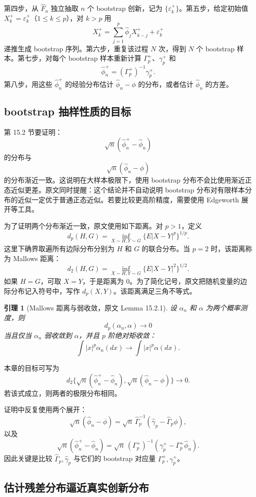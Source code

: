\documentclass[11pt,a4paper,openany]{ctexbook}
\newtheorem{lemma}{引理}[section]
\begin{document}
第四步，从 \(\hat F_n\) 独立抽取 \(n\) 个 bootstrap 创新，记为 \(\{\varepsilon_k^+\}\)。第五步，给定初始值 \(X_k^+=\varepsilon_k^+\)（\(1\le k\le p\)），对 \(k>p\) 用
\[
  X_k^+=\sum_{j=1}^p\hat\phi_jX_{k-j}^+ + \varepsilon_k^+
\]
递推生成 bootstrap 序列。第六步，重复该过程 \(N\) 次，得到 \(N\) 个 bootstrap 样本。第七步，对每个 bootstrap 样本重新计算 \(\Gamma_p^+\)、\(\gamma_p^+\) 和
\[
  \hat\phi_n^+=(\Gamma_p^+)^{-1}\gamma_p^+.
\]
第八步，用这些 \(\hat\phi_n^+\) 的经验分布估计 \(\hat\phi_n-\phi\) 的分布，或者估计 \(\hat\phi_n\) 的方差。

\subsection{bootstrap 抽样性质的目标}

第 15.2 节要证明：
\[
  \sqrt n(\hat\phi_n^+-\hat\phi_n)
\]
的分布与
\[
  \sqrt n(\hat\phi_n-\phi)
\]
的分布渐近一致。这说明在大样本极限下，使用 bootstrap 分布不会比使用渐近正态近似更差。原文同时提醒：这个结论并不自动说明 bootstrap 分布对有限样本分布的近似一定优于普通正态近似。若要比较更高阶精度，需要使用 Edgeworth 展开等工具。

为了证明两个分布渐近一致，原文使用如下距离。对 \(p>1\)，定义
\[
  d_p(H,G)=\inf_{X\sim H,Y\sim G}\{E|X-Y|^p\}^{1/p}.
\]
这里下确界取遍所有边际分布分别为 \(H\) 和 \(G\) 的联合分布。当 \(p=2\) 时，该距离称为 Mallows 距离：
\[
  d_2(H,G)=\inf_{X\sim H,Y\sim G}\{E|X-Y|^2\}^{1/2}.
\]
如果 \(H=G\)，可取 \(X=Y\)，于是距离为 0。为了简化记号，原文把随机变量的边际分布记入符号中，写作 \(d_p(X,Y)\)。该距离满足三角不等式。

\begin{lemma}[Mallows 距离与弱收敛，原文 Lemma 15.2.1]
设 \(\alpha_n\) 和 \(\alpha\) 为两个概率测度，则
\[
  d_p(\alpha_n,\alpha)\to0
\]
当且仅当 \(\alpha_n\) 弱收敛到 \(\alpha\)，并且 \(p\) 阶绝对矩收敛：
\[
  \int |x|^p\alpha_n(dx)\to \int |x|^p\alpha(dx).
\]
\end{lemma}

本章的目标可写为
\[
  d_2\{\sqrt n(\hat\phi_n^+-\hat\phi_n),
      \sqrt n(\hat\phi_n-\phi)\}\to0.
\]
若该式成立，则两者的极限分布相同。

证明中反复使用两个展开：
\[
  \sqrt n(\hat\phi_n-\phi)
  =\sqrt n\,\hat\Gamma_p^{-1}(\hat\gamma_p-\hat\Gamma_p\phi),
\]
以及
\[
  \sqrt n(\hat\phi_n^+-\hat\phi_n)
  =\sqrt n\,(\Gamma_p^+)^{-1}(\gamma_p^+-\Gamma_p^+\hat\phi_n).
\]
因此关键是比较 \(\hat\Gamma_p,\hat\gamma_p\) 与它们的 bootstrap 对应量 \(\Gamma_p^+,\gamma_p^+\)。

\subsection{估计残差分布逼近真实创新分布}
\end{document}
